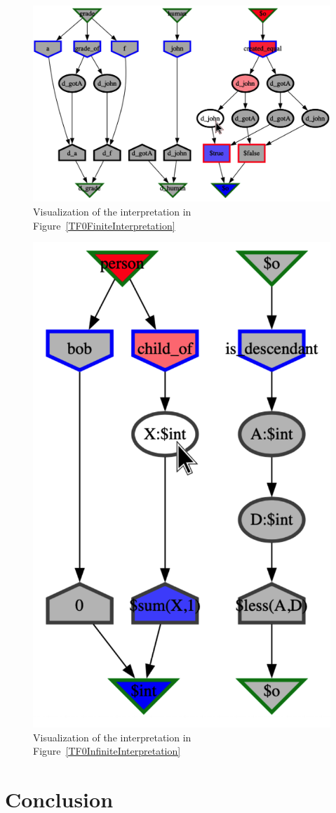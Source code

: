 \documentclass{easychair}
\begin{document}
\begin{figure}[htbp]
\centering
\includegraphics[width=\columnwidth]{TFF_Finite.s.IIV.pdf}
\caption{Visualization of the interpretation in Figure~\ref{TF0FiniteInterpretation}}
\label{TF0FiniteIIV}
\end{figure}

\begin{figure}[htbp]
\centering
\includegraphics[width=0.45\columnwidth]{TFF_Integer.s.IIV.pdf}
\caption{Visualization of the interpretation in Figure~\ref{TF0InfiniteInterpretation}}
\label{TF0InfiniteIIV}
\end{figure}

\section{Conclusion}
\label{Conclusion}
\end{document}
